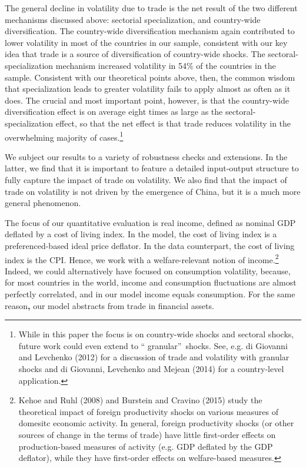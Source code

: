 \documentclass[12pt]{article}
\begin{document}
The general decline in volatility due to trade is the net result of the two
different mechanisms discussed above: sectorial specialization, and
country-wide diversification. The country-wide diversification mechanism
again contributed to lower volatility in most of the countries in our
sample, consistent with our key idea that trade is a source of
diversification of country-wide shocks. The sectoral-specialization
mechanism increased volatility in 54\% of the countries in the sample.
Consistent with our theoretical points above, then, the common wisdom that
specialization leads to greater volatility fails to apply almost as often as
it does. The crucial and most important point, however, is that the
country-wide diversification effect is on average eight times as large as
the sectoral-specialization effect, so that the net effect is that trade
reduces volatility in the overwhelming majority of cases.\footnote{%
While in this paper the focus is on country-wide shocks and sectoral shocks,
future work could even extend to \textquotedblleft
granular\textquotedblright\ shocks. See, e.g. di Giovanni and Levchenko
(2012) for a discussion of trade and volatility with granular shocks and di
Giovanni, Levchenko and Mejean (2014) for a country-level application.}

We subject our results to a variety of robustness checks and extensions. In
the latter, we find that it is important to feature a detailed input-output
structure to fully capture the impact of trade on volatility. We also find
that the impact of trade on volatility is not driven by the emergence of
China, but it is a much more general phenomenon.

The focus of our quantitative evaluation is real income, defined as nominal
GDP deflated by a cost of living index. In the model, the cost of living
index is a preferenced-based ideal price deflator. In the data counterpart,
the cost of living index is the CPI. Hence, we work with a welfare-relevant
notion of income.\footnote{%
Kehoe and Ruhl (2008) and Burstein and Cravino (2015) study the theoretical
impact of foreign productivity shocks on various measures of domesitc
economic activity. In general, foreign productivity shocks (or other sources
of change in the terms of trade) have little first-order effects on
production-based measures of activity (e.g. GDP deflated by the GDP
deflator), while they have first-order effects on welfare-based measures.}
Indeed, we could alternatively have focused on consumption volatility,
because, for most countries in the world, income and consumption
fluctuations are almost perfectly correlated, and in our model income equals
consumption. For the same reason\textbf{, }our model abstracts from trade in
financial assets.
\end{document}
